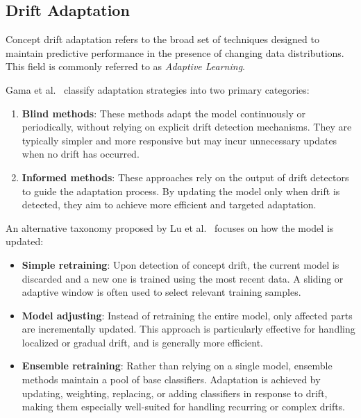 \subsection*{Drift Adaptation}\label{subsec:drift_adaption}

Concept drift adaptation refers to the broad set of techniques designed to
maintain predictive performance in the presence of changing data distributions.
This field is commonly referred to as \emph{Adaptive Learning}.

Gama et al.~\cite{drift_adaptation_survey} classify adaptation strategies into
two primary categories:

\begin{enumerate}
    \item \textbf{Blind methods}: These methods adapt the model continuously or
          periodically, without relying on explicit drift detection mechanisms.
          They are typically simpler and more responsive but may incur unnecessary
          updates when no drift has occurred.
    \item \textbf{Informed methods}: These approaches rely on the output of drift
          detectors to guide the adaptation process. By updating the model only when drift
          is detected, they aim to achieve more efficient and targeted adaptation.
\end{enumerate}

An alternative taxonomy proposed by Lu et
al.~\cite{learning_under_concept_drift} focuses on how the model is updated:

\begin{itemize}
    \item \textbf{Simple retraining}: Upon detection of concept drift, the
          current model is discarded and a new one is trained using the most recent
          data. A sliding or adaptive window is often used to select relevant training
          samples.
    \item \textbf{Model adjusting}: Instead of retraining the entire model,
          only affected parts are incrementally updated. This approach is particularly
          effective for handling localized or gradual drift, and is generally more
          efficient.
    \item \textbf{Ensemble retraining}: Rather than relying on a single model,
          ensemble methods maintain a pool of base classifiers. Adaptation is achieved
          by updating, weighting, replacing, or adding classifiers in response to drift,
          making them especially well-suited for handling recurring or complex drifts.
\end{itemize}

